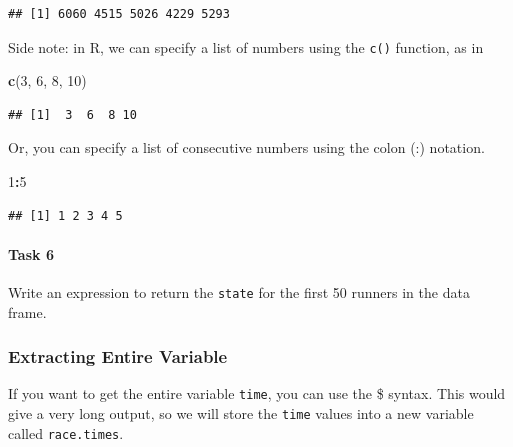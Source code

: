 \documentclass[
]{article}
\newenvironment{Shaded}{\begin{snugshade}}{\end{snugshade}}
\newcommand{\DecValTok}[1]{\textcolor[rgb]{0.00,0.00,0.81}{#1}}
\newcommand{\FunctionTok}[1]{\textcolor[rgb]{0.13,0.29,0.53}{\textbf{#1}}}
\newcommand{\NormalTok}[1]{#1}
\newcommand{\OtherTok}[1]{\textcolor[rgb]{0.56,0.35,0.01}{#1}}
\newcommand{\SpecialCharTok}[1]{\textcolor[rgb]{0.81,0.36,0.00}{\textbf{#1}}}
\begin{document}
\begin{verbatim}
## [1] 6060 4515 5026 4229 5293
\end{verbatim}

Side note: in R, we can specify a list of numbers using the \texttt{c()}
function, as in

\begin{Shaded}
\begin{Highlighting}[]
\FunctionTok{c}\NormalTok{(}\DecValTok{3}\NormalTok{, }\DecValTok{6}\NormalTok{, }\DecValTok{8}\NormalTok{, }\DecValTok{10}\NormalTok{)}
\end{Highlighting}
\end{Shaded}

\begin{verbatim}
## [1]  3  6  8 10
\end{verbatim}

Or, you can specify a list of consecutive numbers using the colon (:)
notation.

\begin{Shaded}
\begin{Highlighting}[]
\DecValTok{1}\SpecialCharTok{:}\DecValTok{5}
\end{Highlighting}
\end{Shaded}

\begin{verbatim}
## [1] 1 2 3 4 5
\end{verbatim}

\paragraph{Task 6}\label{task-6}

Write an expression to return the \texttt{state} for the first 50
runners in the data frame.

\subsubsection{Extracting Entire
Variable}\label{extracting-entire-variable}

If you want to get the entire variable \texttt{time}, you can use the \$
syntax. This would give a very long output, so we will store the
\texttt{time} values into a new variable called \texttt{race.times}.

\begin{Shaded}
\end{Shaded}
\end{document}
